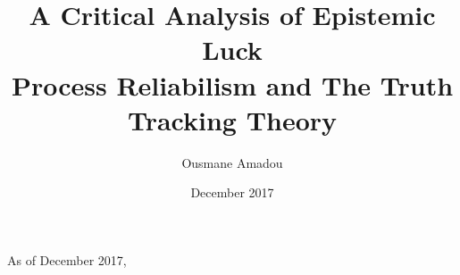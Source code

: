 \documentclass{article}
\title{%
	  A Critical Analysis of Epistemic Luck \\
	    \large Process Reliabilism and The Truth Tracking Theory }
\author{Ousmane Amadou}
\date{December 2017}
\begin{document}
\maketitle

As of December 2017, 
	    
	    
\end{document}
